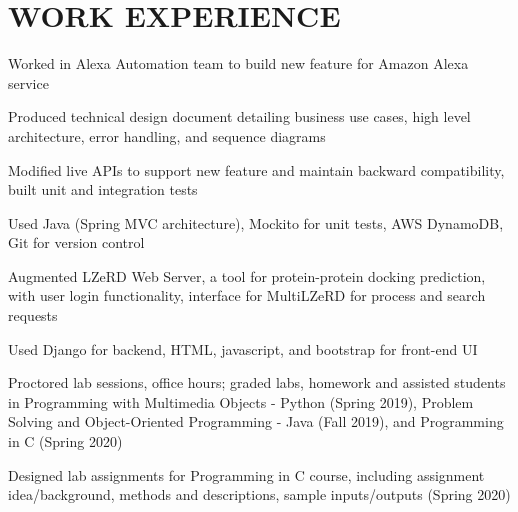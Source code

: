\documentclass[]{deedy-resume-openfont}
\begin{document}
\begin{minipage}[t]{0.67\textwidth} 


\section{WORK EXPERIENCE}

\vspace{\topsep} %
\begin{tightemize}
\item Worked in Alexa Automation team to build new feature for Amazon Alexa service
\item Produced technical design document detailing business use cases, high level architecture, error handling, and sequence diagrams
\item Modified live APIs to support new feature and maintain backward compatibility, built unit and integration tests
\item Used Java (Spring MVC architecture), Mockito for unit tests, AWS DynamoDB, Git for version control
\end{tightemize}
\sectionsep

\begin{tightemize}
\item Augmented LZeRD Web Server, a tool for protein-protein docking prediction, with user login functionality, interface for MultiLZeRD for process and search requests
\item Used Django for backend, HTML, javascript, and bootstrap for front-end UI
\end{tightemize}
\sectionsep

\begin{tightemize}
\item Proctored lab sessions, office hours; graded labs, homework and assisted students in Programming with Multimedia Objects - Python (Spring 2019), Problem Solving and Object-Oriented Programming - Java (Fall 2019), and Programming in C (Spring 2020)
\item Designed lab assignments for Programming in C course, including assignment idea/background, methods and descriptions, sample inputs/outputs (Spring 2020)
\end{tightemize}
\sectionsep


\end{minipage}
\end{document}
